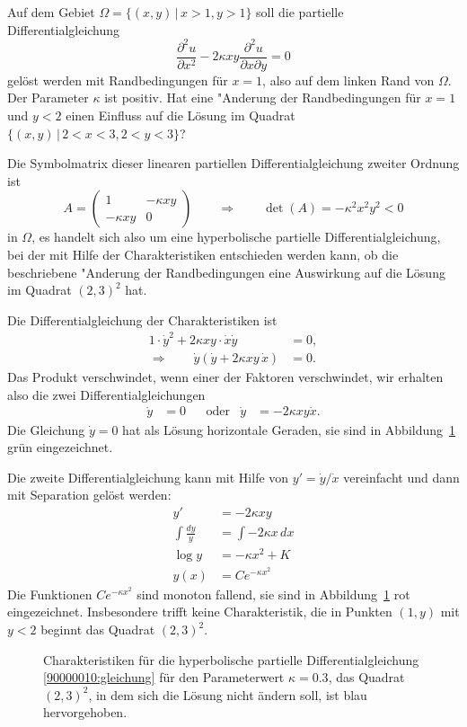 Auf dem Gebiet $\Omega=\{(x,y)\,|\, x>1, y>1\}$ soll die partielle
Differentialgleichung
\begin{equation}
\frac{\partial^2 u}{\partial x^2}-2\kappa xy\frac{\partial^2 u}{\partial x\partial y}=0
\label{90000010:gleichung}
\end{equation}
gelöst werden mit Randbedingungen für $x=1$, also auf dem linken Rand von
$\Omega$. Der Parameter $\kappa$ ist positiv.
Hat eine "Anderung der Randbedingungen für $x=1$ und $y<2$ einen
Einfluss auf die Lösung im Quadrat $\{(x,y)\,|\, 2<x<3,2<y<3\}$?

\begin{loesung}
Die Symbolmatrix dieser linearen partiellen Differentialgleichung zweiter
Ordnung ist
\[
A=\begin{pmatrix}
1&-\kappa xy\\
-\kappa xy&0
\end{pmatrix}
\qquad
\Rightarrow
\qquad
\det(A)=-\kappa^2x^2y^2<0
\]
in $\Omega$, es handelt sich also um eine hyperbolische partielle
Differentialgleichung, bei der mit Hilfe der Charakteristiken entschieden
werden kann, ob die beschriebene "Anderung der Randbedingungen eine 
Auswirkung auf die Lösung im Quadrat $(2,3)^2$ hat.

Die Differentialgleichung der Charakteristiken ist
\begin{align*}
1\cdot \dot y^2 +2\kappa xy\cdot \dot x \dot y&=0,\\
\Rightarrow\qquad
\dot y(\dot y+2\kappa xy\,\dot x)&=0.
\end{align*}
Das Produkt verschwindet, wenn einer der Faktoren verschwindet, wir erhalten
also die zwei Differentialgleichungen
\begin{align*}
\dot y &= 0
&
&\text{oder}
&
\dot y&=-2\kappa xy\dot x.
\end{align*}
Die Gleichung $\dot y=0$ hat als Lösung horizontale Geraden, sie sind
in Abbildung~\ref{90000010:bild} grün eingezeichnet.

Die zweite Differentialgleichung kann mit Hilfe von $y'=\dot y/\dot x$ 
vereinfacht und dann mit Separation gelöst werden:
\begin{align*}
y'&=-2\kappa xy\\
\int \frac{dy}y&=\int -2\kappa x\,dx\\
\log y&=-\kappa x^2+K\\
y(x)&=Ce^{-\kappa x^2}
\end{align*}
Die Funktionen $Ce^{-\kappa x^2}$ sind monoton fallend, sie sind in
Abbildung~\ref{90000010:bild} rot eingezeichnet.
Insbesondere trifft
keine Charakteristik, die in Punkten $(1,y)$ mit $y<2$ beginnt das
Quadrat $(2,3)^2$.
\begin{figure}
\begin{center}
\end{center}
\caption{Charakteristiken für die hyperbolische partielle
Differentialgleichung \eqref{90000010:gleichung} für den Parameterwert
$\kappa =0.3$, das Quadrat $(2,3)^2$, in dem sich die Lösung nicht
ändern soll, ist blau hervorgehoben.
\label{90000010:bild}}
\end{figure}
\end{loesung}

